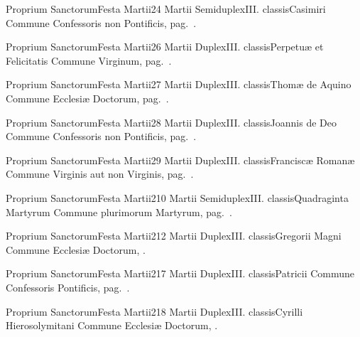 \documentclass[nocturnale-romanum.tex]{subfiles}
\begin{document}

	{Proprium Sanctorum}{Festa Martii}{2}{4 Martii}
	{Semiduplex}{III. classis}{Casimiri}
	{Commune Confessoris non Pontificis, pag.\ \pageref{M-CONP}.}
	{}

	{Proprium Sanctorum}{Festa Martii}{2}{6 Martii}
	{Duplex}{III. classis}{Perpetuæ et Felicitatis}
	{Commune Virginum, pag.\ \pageref{M-MU}.}
	{}

	{Proprium Sanctorum}{Festa Martii}{2}{7 Martii}
	{Duplex}{III. classis}{Thomæ de Aquino}
	{Commune Ecclesiæ Doctorum, pag.\ \pageref{M-CODO}.}
	{}

	{Proprium Sanctorum}{Festa Martii}{2}{8 Martii}
	{Duplex}{III. classis}{Joannis de Deo}
	{Commune Confessoris non Pontificis, pag.\ \pageref{M-CONP}.}
	{}

	{Proprium Sanctorum}{Festa Martii}{2}{9 Martii}
	{Duplex}{III. classis}{Franciscæ Romanæ}
	{Commune Virginis aut non Virginis, pag.\ \pageref{M-MU}.}
	{}

	{Proprium Sanctorum}{Festa Martii}{2}{10 Martii}
	{Semiduplex}{III. classis}{Quadraginta Martyrum}
	{Commune plurimorum Martyrum, pag.\ \pageref{M-PMEX}.}
	{}

	{Proprium Sanctorum}{Festa Martii}{2}{12 Martii}
	{Duplex}{III. classis}{Gregorii Magni}
	{Commune Ecclesiæ Doctorum, \pageref{M-CODO}.}
	{}

	{Proprium Sanctorum}{Festa Martii}{2}{17 Martii}
	{Duplex}{III. classis}{Patricii}
	{Commune Confessoris Pontificis, pag.\ \pageref{M-COPO}.}
	{}

	{Proprium Sanctorum}{Festa Martii}{2}{18 Martii}
	{Duplex}{III. classis}{Cyrilli Hierosolymitani}
	{Commune Ecclesiæ Doctorum, \pageref{M-CODO}.}
	{}
\end{document}
